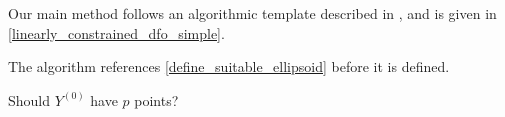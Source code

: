 \documentclass{article}
\begin{document}
%
%
%
%
%
%
%
%

Our main method follows
an algorithmic template described in \cite{Conejo:2013:GCT:2620806.2621814}, and is given in \cref{linearly_constrained_dfo_simple}.  



\color{magenta}
The algorithm references \cref{define_suitable_ellipsoid} before it is defined.

Should $Y^{(0)}$ have $p$ points?
\color{black}
\end{document}
